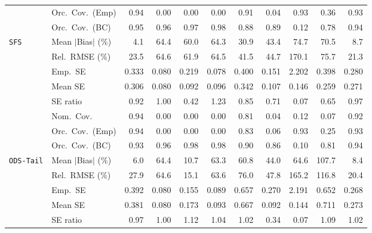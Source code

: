 \begin{landscape}
\begin{longtable}{llrrrrrrrrr}
 & Orc.\ Cov.\ (Emp) & \cellcolor{rankone}0.94 & 0.00 & 0.00 & 0.00 & \cellcolor{rankthree}0.91 & 0.04 & \cellcolor{ranktwo}0.93 & 0.36 & \cellcolor{ranktwo}0.93 \\
 & Orc.\ Cov.\ (BC) & \cellcolor{rankone}0.95 & \cellcolor{ranktwo}0.96 & \cellcolor{rankthree}0.97 & 0.98 & 0.88 & 0.89 & 0.12 & 0.78 & \cellcolor{ranktwo}0.94 \\
\addlinespace[2pt]
\quad \texttt{SFS} & Mean $|$Bias$|$ (\%) & \cellcolor{rankone}4.1 & 64.4 & 60.0 & 64.3 & \cellcolor{rankthree}30.9 & 43.4 & 74.7 & 70.5 & \cellcolor{ranktwo}8.7 \\
 & Rel.\ RMSE (\%) & \cellcolor{ranktwo}23.5 & 64.6 & 61.9 & 64.5 & \cellcolor{rankthree}41.5 & 44.7 & 170.1 & 75.7 & \cellcolor{rankone}21.3 \\
 & Emp.\ SE & 0.333 & 0.080 & 0.219 & 0.078 & 0.400 & 0.151 & 2.202 & 0.398 & 0.280 \\
 & Mean SE & 0.306 & 0.080 & 0.092 & 0.096 & 0.342 & 0.107 & 0.146 & 0.259 & 0.271 \\
 & SE ratio & \cellcolor{rankthree}0.92 & \cellcolor{rankone}1.00 & 0.42 & 1.23 & 0.85 & 0.71 & 0.07 & 0.65 & \cellcolor{ranktwo}0.97 \\
 & Nom.\ Cov. & \cellcolor{rankone}0.94 & 0.00 & 0.00 & 0.00 & \cellcolor{rankthree}0.81 & 0.04 & 0.12 & 0.07 & \cellcolor{ranktwo}0.92 \\
 & Orc.\ Cov.\ (Emp) & \cellcolor{rankone}0.94 & 0.00 & 0.00 & 0.00 & \cellcolor{rankthree}0.83 & 0.06 & \cellcolor{ranktwo}0.93 & 0.25 & \cellcolor{ranktwo}0.93 \\
 & Orc.\ Cov.\ (BC) & \cellcolor{ranktwo}0.93 & \cellcolor{rankone}0.96 & \cellcolor{rankthree}0.98 & \cellcolor{rankthree}0.98 & 0.90 & 0.86 & 0.10 & 0.81 & \cellcolor{rankone}0.94 \\
\addlinespace[2pt]
\quad \texttt{ODS-Tail} & Mean $|$Bias$|$ (\%) & \cellcolor{rankone}6.0 & 64.4 & \cellcolor{rankthree}10.7 & 63.3 & 60.8 & 44.0 & 64.6 & 107.7 & \cellcolor{ranktwo}8.4 \\
 & Rel.\ RMSE (\%) & \cellcolor{rankthree}27.9 & 64.6 & \cellcolor{rankone}15.1 & 63.6 & 76.0 & 47.8 & 165.2 & 116.8 & \cellcolor{ranktwo}20.4 \\
 & Emp.\ SE & 0.392 & 0.080 & 0.155 & 0.089 & 0.657 & 0.270 & 2.191 & 0.652 & 0.268 \\
 & Mean SE & 0.381 & 0.080 & 0.173 & 0.093 & 0.667 & 0.092 & 0.144 & 0.711 & 0.273 \\
 & SE ratio & \cellcolor{rankthree}0.97 & \cellcolor{rankone}1.00 & 1.12 & 1.04 & \cellcolor{ranktwo}1.02 & 0.34 & 0.07 & 1.09 & \cellcolor{ranktwo}1.02 \\

\end{longtable}
\end{landscape}
